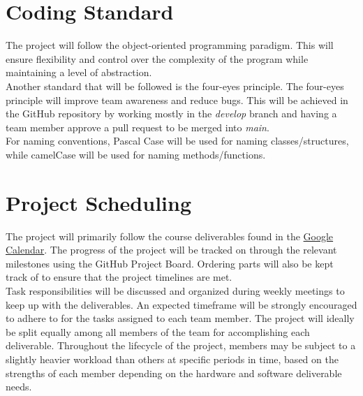 \documentclass{article}
\begin{document}
	\section{Coding Standard}
	The project will follow the object-oriented programming paradigm. This will ensure flexibility 
	and control over the complexity of the program while maintaining a level of abstraction.\\

	\noindent Another standard that will be followed is the four-eyes principle. The four-eyes principle 
	will improve team awareness and reduce bugs. This will be achieved in the GitHub repository by 
	working mostly in the \emph{develop} branch and having a team member approve a pull request to be merged into \emph{main}.\\

	\noindent For naming conventions, Pascal Case will be used for naming classes/structures, while camelCase will be used for naming methods/functions.

	\section{Project Scheduling}
	The project will primarily follow the course deliverables found in the 
	\href{https://calendar.google.com/calendar/embed?src=rnboqiaki1k2la7rpu3bn0um58%40group.calendar.google.com&ctz=America%2FToronto}{Google Calendar}. 
	The progress of the project will be tracked on through the relevant milestones using the GitHub Project Board. 
	Ordering parts will also be kept track of to ensure that the project timelines are met.\\

\noindent Task responsibilities will be discussed and organized during weekly meetings to keep up with the deliverables. 
An expected timeframe will be strongly encouraged to adhere to for the tasks assigned to each team member. The project 
will ideally be split equally among all members of the team for accomplishing each deliverable. Throughout the lifecycle 
of the project, members may be subject to a slightly heavier workload than others at specific periods in time, based on 
the strengths of each member depending on the hardware and software deliverable needs. 
\end{document}
